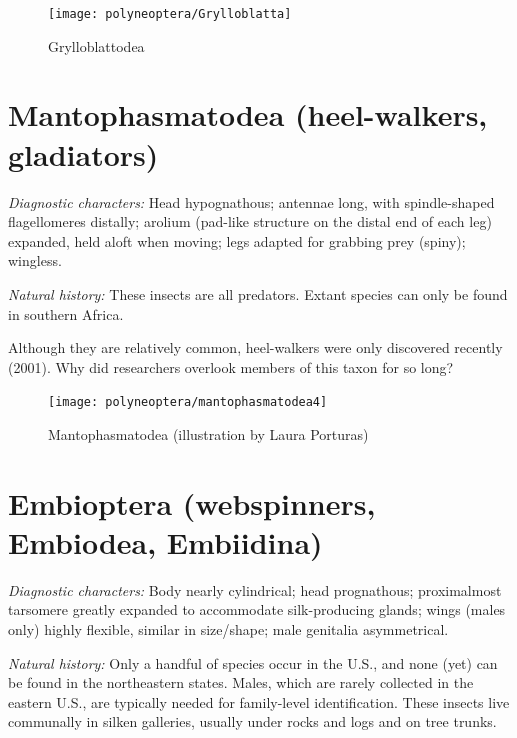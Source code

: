 \begin{figure}[ht!]
  \centering
    \texttt{[image: polyneoptera/Grylloblatta]}
  \caption{Grylloblattodea \citep[modified from][Figs. 1--2]{walker1914new}}
  \label{fig:grylloblatt}
\end{figure}

\section{Mantophasmatodea (heel-walkers, gladiators)}

\noindent{}\textit{Diagnostic characters:} Head hypognathous; antennae long, with spindle-shaped flagellomeres distally; arolium (pad-like structure on the distal end of each leg) expanded, held aloft when moving; legs adapted for grabbing prey (spiny); wingless.\vspace{3mm}

\noindent{}\textit{Natural history:} These insects are all predators. Extant species can only be found in southern Africa.\vspace{3mm}

\begin{theo}
{}Although they are relatively common, heel-walkers were only discovered recently (2001). Why did researchers overlook members of this taxon for so long?
\end{theo} \vspace{3mm}

\begin{figure}[ht!]
  \centering
    \texttt{[image: polyneoptera/mantophasmatodea4]}
  \caption{Mantophasmatodea (illustration by Laura Porturas)}
  \label{fig:mantophas}
\end{figure}

\section{Embioptera (webspinners, Embiodea, Embiidina)}
\noindent{}\textit{Diagnostic characters:} Body nearly cylindrical; head prognathous; proximalmost tarsomere greatly expanded to accommodate silk-producing glands;  wings (males only) highly flexible, similar in size/shape; male genitalia asymmetrical.\vspace{3mm}

\noindent{}\textit{Natural history:} Only a handful of species occur in the U.S., and none (yet) can be found in the northeastern states. Males, which are rarely collected in the eastern U.S., are typically needed for family-level identification. These insects live communally in silken galleries, usually under rocks and logs and on tree trunks.\vspace{3mm}

